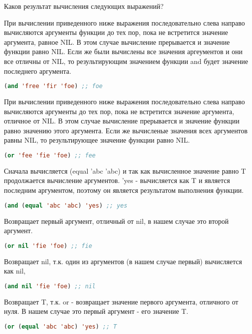 \documentclass[a4paper,oneside,12pt]{extreport}
\begin{document}
\begin{task}
	Каков результат вычисления следующих выражений?

	При вычислении приведенного ниже выражения 
	последовательно слева направо вычисляются аргументы функции до тех пор, пока не
	встретится значение аргумента, равное NIL. 
	В этом случае вычисление прерывается и значение функции равно NIL. 
	Если же были вычислены все значения аргеументов и
	они все отличны от NIL, то результирующим значением
	функции and будет значение последнего аргумента.
	\begin{lstlisting}[language=Lisp]
(and 'free 'fir 'foe) ;; foe 
	\end{lstlisting}

	При вычислении приведенного ниже выражения 
	последовательно слева направо вычисляются аргументы
	до тех пор, пока не встретится значение аргумента, отличное от NIL.
	В этом случае вычисление прерывается и значение функции равно
	значению этого аргумента.
	Если же вычисленые значения всех аргументов равны NIL, 
	то результирующее значение функции
	равно NIL.
	\begin{lstlisting}[language=Lisp]
(or 'fee 'fie 'foe) ;; fee
	\end{lstlisting}

	Сначала вычисляется (equal 'abc 'abc) и так как вычисленное значение равно T
	продолжается вычисление аргументов. 
	'yes - вычисляется как T и является последним аргументом, поэтому он
	является результатом выполнения функции.
	\begin{lstlisting}[language=Lisp]
(and (equal 'abc 'abc) 'yes) ;; yes
	\end{lstlisting}

	Возвращает первый аргумент, отличный от nil, в нашем случае это второй аргумент.
	\begin{lstlisting}[language=Lisp]
(or nil 'fie 'foe) ;; fie
	\end{lstlisting}

	Возвращает nil, т.к. один из аргументов (в нашем случае первый) вычисляется как nil,
	\begin{lstlisting}[language=Lisp]
(and nil 'fie 'foe) ;; nil
	\end{lstlisting}

	Возвращает T, т.к. or - возвращает значение первого аргумента, отличного от нуля.
	В нашем случае это первый аргумент - его значение T.
	\begin{lstlisting}[language=Lisp]
(or (equal 'abc 'abc) 'yes) ;; T
	\end{lstlisting}

\end{task}
\end{document}
